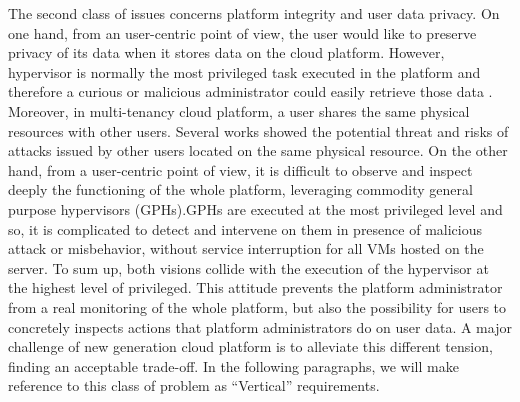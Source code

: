 \documentclass{acm_proc_article-sp} %
\begin{document}
The second class of issues concerns platform integrity and user data privacy. On one hand, from an user-centric point of view, the user would like to preserve privacy of its data when it stores data on the cloud platform. However, hypervisor is normally the most privileged task executed in the platform and therefore a curious or malicious administrator could easily retrieve those data \cite{cloudvisor:zhang}. Moreover, in multi-tenancy cloud platform, a user shares the same physical resources with other users. Several works \cite{sec:you, bot:att} showed the potential threat and risks of attacks issued by other users located on the same physical resource.
On the other hand, from a user-centric point of view, it is difficult to observe and inspect deeply the functioning of the whole platform, leveraging commodity general purpose hypervisors (GPHs).GPHs are executed at the most privileged level and so, it is complicated to detect and intervene on them in presence of malicious attack or misbehavior, without service interruption for all VMs hosted on the server. 
To sum up, both visions collide with the execution of the hypervisor at the highest level of privileged. This attitude prevents the platform administrator from a real monitoring of the whole platform, but also the possibility for users to concretely inspects actions that platform administrators do on user data. A major challenge of new generation cloud platform is to alleviate this different tension, finding an acceptable trade-off. In the following paragraphs, we will make reference to this class of problem as ``Vertical'' requirements.
\end{document}
